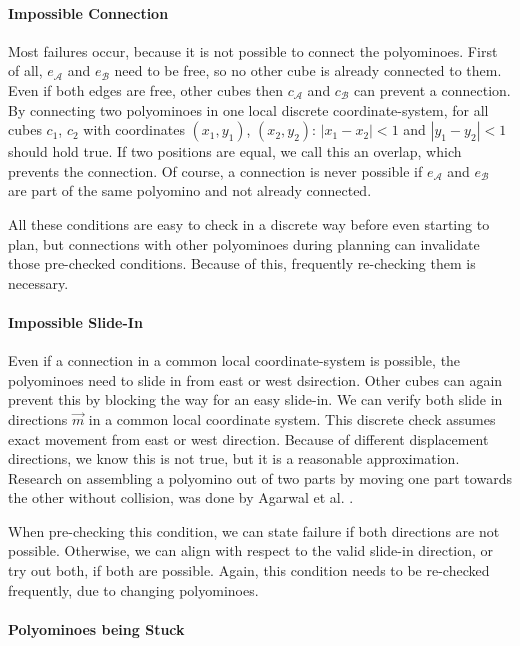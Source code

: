 \paragraph{Impossible Connection}

Most failures occur, because it is not possible to connect the polyominoes.
First of all, $e_\mathcal{A}$ and $e_\mathcal{B}$ need to be free, so no other cube is already connected to them.
Even if both edges are free, other cubes then $c_\mathcal{A}$ and $c_\mathcal{B}$ can prevent a connection.
By connecting two polyominoes in one local discrete coordinate-system, for all cubes $c_1$, $c_2$ with coordinates $(x_1, y_1)$, $(x_2, y_2)$: $\left|x_1 - x_2\right| < 1$ and $\left|y_1 - y_2\right| < 1$ should hold true.
If two positions are equal, we call this an overlap, which prevents the connection.
Of course, a connection is never possible if $e_\mathcal{A}$ and $e_\mathcal{B}$ are part of the same polyomino and not already connected.

All these conditions are easy to check in a discrete way before even starting to plan, but connections with other polyominoes during planning can invalidate those pre-checked conditions.
Because of this, frequently re-checking them is necessary.

\paragraph{Impossible Slide-In}

Even if a connection in a common local coordinate-system is possible, the polyominoes need to slide in from east or west dsirection.
Other cubes can again prevent this by blocking the way for an easy slide-in.
We can verify both slide in directions $\vec{m}$ in a common local coordinate system.
This discrete check assumes exact movement from east or west direction.
Because of different displacement directions, we know this is not true, but it is a reasonable approximation.
Research on assembling a polyomino out of two parts by moving one part towards the other without collision, was done by Agarwal et al. \cite{agarwal2021}. 

When pre-checking this condition, we can state failure if both directions are not possible.
Otherwise, we can align with respect to the valid slide-in direction, or try out both, if both are possible.
Again, this condition needs to be re-checked frequently, due to changing polyominoes.

\paragraph{Polyominoes being Stuck}

